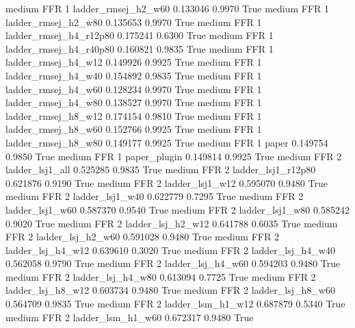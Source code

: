     medium      FFR                 1    ladder_rmsej_h2_w60   0.133046      0.9970    True
    medium      FFR                 1    ladder_rmsej_h2_w80   0.135653      0.9970    True
    medium      FFR                 1 ladder_rmsej_h4_r12p80   0.175241      0.6300    True
    medium      FFR                 1 ladder_rmsej_h4_r40p80   0.160821      0.9835    True
    medium      FFR                 1    ladder_rmsej_h4_w12   0.149926      0.9925    True
    medium      FFR                 1    ladder_rmsej_h4_w40   0.154892      0.9835    True
    medium      FFR                 1    ladder_rmsej_h4_w60   0.128234      0.9970    True
    medium      FFR                 1    ladder_rmsej_h4_w80   0.138527      0.9970    True
    medium      FFR                 1    ladder_rmsej_h8_w12   0.174154      0.9810    True
    medium      FFR                 1    ladder_rmsej_h8_w60   0.152766      0.9925    True
    medium      FFR                 1    ladder_rmsej_h8_w80   0.149177      0.9925    True
    medium      FFR                 1                  paper   0.149754      0.9850    True
    medium      FFR                 1           paper_plugin   0.149814      0.9925    True
    medium      FFR                 2        ladder_lsj1_all   0.525285      0.9835    True
    medium      FFR                 2     ladder_lsj1_r12p80   0.621876      0.9190    True
    medium      FFR                 2        ladder_lsj1_w12   0.595070      0.9480    True
    medium      FFR                 2        ladder_lsj1_w40   0.622779      0.7295    True
    medium      FFR                 2        ladder_lsj1_w60   0.587370      0.9540    True
    medium      FFR                 2        ladder_lsj1_w80   0.585242      0.9020    True
    medium      FFR                 2      ladder_lsj_h2_w12   0.641788      0.6035    True
    medium      FFR                 2      ladder_lsj_h2_w60   0.591028      0.9480    True
    medium      FFR                 2      ladder_lsj_h4_w12   0.639610      0.3020    True
    medium      FFR                 2      ladder_lsj_h4_w40   0.562058      0.9790    True
    medium      FFR                 2      ladder_lsj_h4_w60   0.594203      0.9480    True
    medium      FFR                 2      ladder_lsj_h4_w80   0.613094      0.7725    True
    medium      FFR                 2      ladder_lsj_h8_w12   0.603734      0.9480    True
    medium      FFR                 2      ladder_lsj_h8_w60   0.564709      0.9835    True
    medium      FFR                 2      ladder_lsm_h1_w12   0.687879      0.5340    True
    medium      FFR                 2      ladder_lsm_h1_w60   0.672317      0.9480    True

